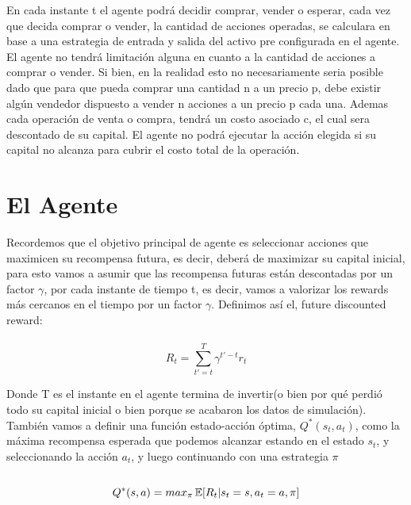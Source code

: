 En cada instante t el agente podrá decidir comprar, vender o esperar, cada vez que decida comprar o vender, la cantidad de acciones operadas, se calculara en base a una estrategia de entrada y salida del activo pre configurada en el agente.
El agente no tendrá limitación alguna en cuanto a la cantidad de acciones a comprar o vender. Si bien, en la realidad esto no necesariamente seria posible dado que para que pueda comprar una cantidad n a un precio p, debe existir algún vendedor dispuesto a vender n acciones a un precio p cada una.
Ademas cada operación de venta o compra, tendrá un costo asociado c, el cual sera descontado de su capital. El agente no podrá ejecutar la acción elegida si su capital no alcanza para cubrir el costo total de la operación.


\section{El Agente}

Recordemos que el objetivo principal de agente es seleccionar acciones que maximicen su recompensa futura, es decir, deberá de maximizar su capital inicial, para esto vamos a asumir que las recompensa futuras están descontadas por un factor $\gamma$, por cada instante de tiempo t, es decir, vamos a valorizar los rewards más cercanos en el tiempo por un factor $\gamma$. Definimos así el, future discounted reward:
\\\\
\begin{equation}
	 R_t = \sum\limits_{t'= t}^T  \gamma^{t'-t} r_t
\end{equation}

Donde T es el instante en el agente termina de invertir(o bien por qué perdió todo su capital inicial o bien porque se acabaron los datos de simulación).\\
También vamos a definir una función estado-acción óptima, $Q^*(s_t, a_t)$, como la máxima recompensa esperada que podemos alcanzar estando en el estado $s_t$, y seleccionando la acción $a_t$, y luego continuando con una estrategia $\pi$
\\\\
\begin{equation}
Q^*(s, a) = max_{\pi} \operatorname{\mathbb{E}} [R_t  |  s_t = s, a_t = a, \pi]
\end{equation}
\\

